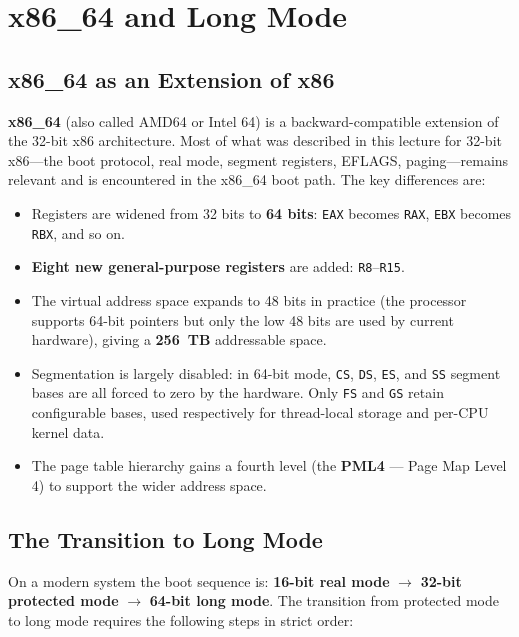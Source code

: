 \documentclass[11pt]{article}
\begin{document}
\section{x86\_64 and Long Mode}

\subsection{x86\_64 as an Extension of x86}

\textbf{x86\_64} (also called AMD64 or Intel 64) is a backward-compatible extension of the
32-bit x86 architecture. Most of what was described in this lecture for 32-bit x86---the boot
protocol, real mode, segment registers, EFLAGS, paging---remains relevant and is encountered
in the x86\_64 boot path. The key differences are:

\begin{itemize}
    \item Registers are widened from 32 bits to \textbf{64 bits}: \texttt{EAX} becomes
          \texttt{RAX}, \texttt{EBX} becomes \texttt{RBX}, and so on.
    \item \textbf{Eight new general-purpose registers} are added: \texttt{R8}--\texttt{R15}.
    \item The virtual address space expands to 48 bits in practice (the processor supports
          64-bit pointers but only the low 48 bits are used by current hardware), giving a
          \textbf{256~TB} addressable space.
    \item Segmentation is largely disabled: in 64-bit mode, \texttt{CS}, \texttt{DS},
          \texttt{ES}, and \texttt{SS} segment bases are all forced to zero by the hardware.
          Only \texttt{FS} and \texttt{GS} retain configurable bases, used respectively for
          thread-local storage and per-CPU kernel data.
    \item The page table hierarchy gains a fourth level (the \textbf{PML4} --- Page Map Level 4)
          to support the wider address space.
\end{itemize}

\subsection{The Transition to Long Mode}

On a modern system the boot sequence is: \textbf{16-bit real mode} $\to$ \textbf{32-bit
protected mode} $\to$ \textbf{64-bit long mode}. The transition from protected mode to long
mode requires the following steps in strict order:
\end{document}
